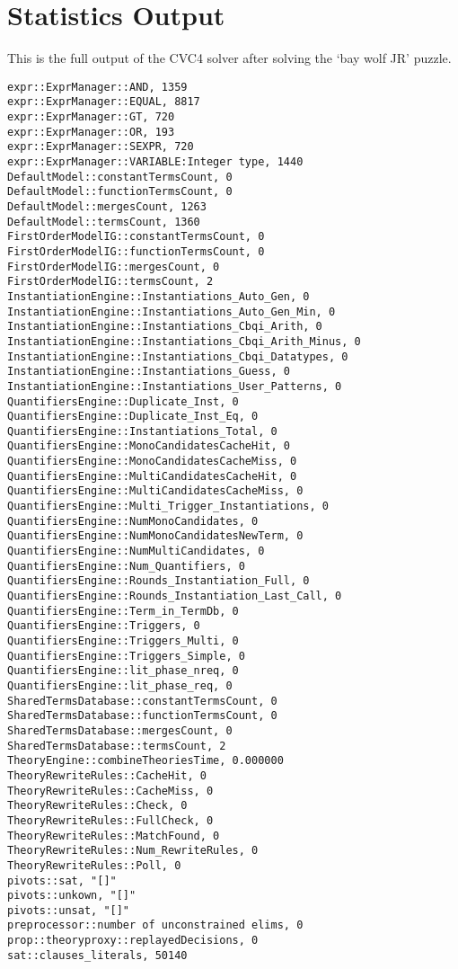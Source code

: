 \chapter{Statistics Output}
This is the full output of the CVC4 solver after solving the `bay wolf JR' puzzle.
\begin{lstlisting}
expr::ExprManager::AND, 1359
expr::ExprManager::EQUAL, 8817
expr::ExprManager::GT, 720
expr::ExprManager::OR, 193
expr::ExprManager::SEXPR, 720
expr::ExprManager::VARIABLE:Integer type, 1440
DefaultModel::constantTermsCount, 0
DefaultModel::functionTermsCount, 0
DefaultModel::mergesCount, 1263
DefaultModel::termsCount, 1360
FirstOrderModelIG::constantTermsCount, 0
FirstOrderModelIG::functionTermsCount, 0
FirstOrderModelIG::mergesCount, 0
FirstOrderModelIG::termsCount, 2
InstantiationEngine::Instantiations_Auto_Gen, 0
InstantiationEngine::Instantiations_Auto_Gen_Min, 0
InstantiationEngine::Instantiations_Cbqi_Arith, 0
InstantiationEngine::Instantiations_Cbqi_Arith_Minus, 0
InstantiationEngine::Instantiations_Cbqi_Datatypes, 0
InstantiationEngine::Instantiations_Guess, 0
InstantiationEngine::Instantiations_User_Patterns, 0
QuantifiersEngine::Duplicate_Inst, 0
QuantifiersEngine::Duplicate_Inst_Eq, 0
QuantifiersEngine::Instantiations_Total, 0
QuantifiersEngine::MonoCandidatesCacheHit, 0
QuantifiersEngine::MonoCandidatesCacheMiss, 0
QuantifiersEngine::MultiCandidatesCacheHit, 0
QuantifiersEngine::MultiCandidatesCacheMiss, 0
QuantifiersEngine::Multi_Trigger_Instantiations, 0
QuantifiersEngine::NumMonoCandidates, 0
QuantifiersEngine::NumMonoCandidatesNewTerm, 0
QuantifiersEngine::NumMultiCandidates, 0
QuantifiersEngine::Num_Quantifiers, 0
QuantifiersEngine::Rounds_Instantiation_Full, 0
QuantifiersEngine::Rounds_Instantiation_Last_Call, 0
QuantifiersEngine::Term_in_TermDb, 0
QuantifiersEngine::Triggers, 0
QuantifiersEngine::Triggers_Multi, 0
QuantifiersEngine::Triggers_Simple, 0
QuantifiersEngine::lit_phase_nreq, 0
QuantifiersEngine::lit_phase_req, 0
SharedTermsDatabase::constantTermsCount, 0
SharedTermsDatabase::functionTermsCount, 0
SharedTermsDatabase::mergesCount, 0
SharedTermsDatabase::termsCount, 2
TheoryEngine::combineTheoriesTime, 0.000000
TheoryRewriteRules::CacheHit, 0
TheoryRewriteRules::CacheMiss, 0
TheoryRewriteRules::Check, 0
TheoryRewriteRules::FullCheck, 0
TheoryRewriteRules::MatchFound, 0
TheoryRewriteRules::Num_RewriteRules, 0
TheoryRewriteRules::Poll, 0
pivots::sat, "[]"
pivots::unkown, "[]"
pivots::unsat, "[]"
preprocessor::number of unconstrained elims, 0
prop::theoryproxy::replayedDecisions, 0
sat::clauses_literals, 50140

\end{lstlisting}
